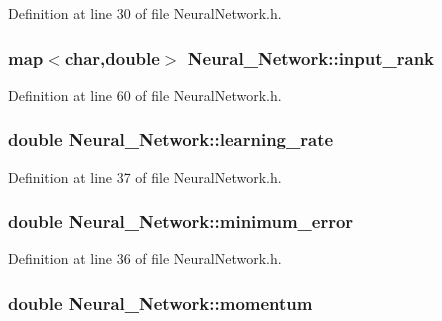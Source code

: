 Definition at line 30 of file Neural\-Network.\-h.

\hypertarget{a00003_adf2c6662b130ed1582025ea2cccacbe2}{
\subsubsection[{input\-\_\-rank}]{\setlength{\rightskip}{0pt plus 5cm}map$<$char,double$>$ Neural\-\_\-\-Network\-::input\-\_\-rank\hspace{0.3cm}{\ttfamily [private]}}}\label{d1/d7c/a00003_adf2c6662b130ed1582025ea2cccacbe2}


Definition at line 60 of file Neural\-Network.\-h.

\hypertarget{a00003_a1994986029a1ef9d55fa4bb1b440210b}{
\subsubsection[{learning\-\_\-rate}]{\setlength{\rightskip}{0pt plus 5cm}double Neural\-\_\-\-Network\-::learning\-\_\-rate\hspace{0.3cm}{\ttfamily [private]}}}\label{d1/d7c/a00003_a1994986029a1ef9d55fa4bb1b440210b}


Definition at line 37 of file Neural\-Network.\-h.

\hypertarget{a00003_aa2898d2ec7ac091b6d40916d4b113a93}{
\subsubsection[{minimum\-\_\-error}]{\setlength{\rightskip}{0pt plus 5cm}double Neural\-\_\-\-Network\-::minimum\-\_\-error\hspace{0.3cm}{\ttfamily [private]}}}\label{d1/d7c/a00003_aa2898d2ec7ac091b6d40916d4b113a93}


Definition at line 36 of file Neural\-Network.\-h.

\hypertarget{a00003_a3a3ea713384da26e538bc60da8410a75}{
\subsubsection[{momentum}]{\setlength{\rightskip}{0pt plus 5cm}double Neural\-\_\-\-Network\-::momentum\hspace{0.3cm}{\ttfamily [private]}}}\label{d1/d7c/a00003_a3a3ea713384da26e538bc60da8410a75}


